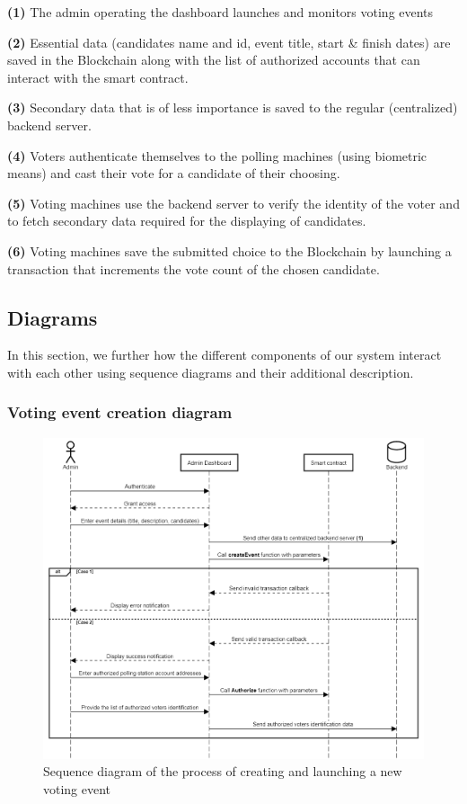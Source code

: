 \begin{list}{}{}
\item \textbf{(1)} The admin operating the dashboard launches and monitors voting events
\item \textbf{(2)} Essential data (candidates name and id, event title, start \& finish dates) are saved in the Blockchain along with the list of authorized accounts that can interact with the smart contract.
\item \textbf{(3)} Secondary data that is of less importance is saved to the regular (centralized) backend server.
\item \textbf{(4)} Voters authenticate themselves to the polling machines (using biometric means) and cast their vote for a candidate of their choosing.
\item \textbf{(5)} Voting machines use the backend server to verify the identity of the voter and to fetch secondary data required for the displaying of candidates.
\item \textbf{(6)} Voting machines save the submitted choice to the Blockchain by launching a transaction that increments the vote count of the chosen candidate.
\end{list}

\subsection{Diagrams}

In this section, we further how the different components of our system interact with each other using sequence diagrams and their additional description.

\subsubsection{Voting event creation diagram}

\begin{figure}[H]
	\centering
		\includegraphics[width=14cm]{images/chapter3/admin_sequence_diagram.png}
		\caption{{\footnotesize Sequence diagram of the process of creating and launching a new voting event}}
\end{figure}

